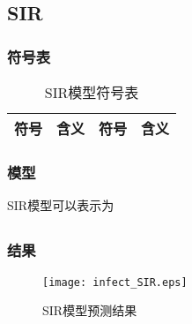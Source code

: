 \subsection{SIR}
\subsubsection{符号表}
\begin{table}[H]
	\centering
	\caption{SIR模型符号表}
	\begin{tabular}{llll}
		\hline
		符号&含义&符号&含义\\
		\hline
		\hline
	\end{tabular}
\end{table}
\subsubsection{模型}
	SIR模型可以表示为
	\begin{align}
	\end{align}
\subsubsection{结果}
	\begin{figure}[H]
		\centering
		\texttt{[image: infect\_SIR.eps]}
		\caption{SIR模型预测结果}
	\end{figure}